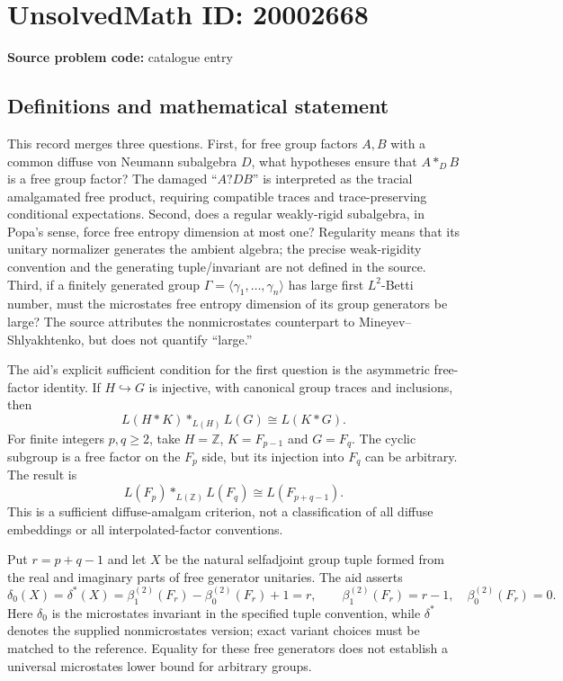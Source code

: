 \documentclass[11pt]{article}
\newcommand{\Z}{\mathbb{Z}}
\begin{document}
\section*{UnsolvedMath ID: 20002668}
\textbf{Source problem code:} catalogue entry
\subsection{Definitions and mathematical statement}
This record merges three questions. First, for free group factors $A,B$ with a common diffuse von Neumann subalgebra $D$, what hypotheses ensure that $A*_D B$ is a free group factor? The damaged ``$A?DB$'' is interpreted as the tracial amalgamated free product, requiring compatible traces and trace-preserving conditional expectations. Second, does a regular weakly-rigid subalgebra, in Popa's sense, force free entropy dimension at most one? Regularity means that its unitary normalizer generates the ambient algebra; the precise weak-rigidity convention and the generating tuple/invariant are not defined in the source. Third, if a finitely generated group $\Gamma=\langle\gamma_1,\ldots,\gamma_n\rangle$ has large first $L^2$-Betti number, must the microstates free entropy dimension of its group generators be large? The source attributes the nonmicrostates counterpart to Mineyev--Shlyakhtenko, but does not quantify ``large.''

The aid's explicit sufficient condition for the first question is the asymmetric free-factor identity. If $H\hookrightarrow G$ is injective, with canonical group traces and inclusions, then
\[
L(H*K)*_{L(H)}L(G)\cong L(K*G).
\]
For finite integers $p,q\geq2$, take $H=\Z$, $K=F_{p-1}$ and $G=F_q$. The cyclic subgroup is a free factor on the $F_p$ side, but its injection into $F_q$ can be arbitrary. The result is
\[
L(F_p)*_{L(\Z)}L(F_q)\cong L(F_{p+q-1}).
\]
This is a sufficient diffuse-amalgam criterion, not a classification of all diffuse embeddings or all interpolated-factor conventions.

Put $r=p+q-1$ and let $X$ be the natural selfadjoint group tuple formed from the real and imaginary parts of free generator unitaries. The aid asserts
\[
\delta_0(X)=\delta^*(X)=\beta_1^{(2)}(F_r)-\beta_0^{(2)}(F_r)+1=r,
\qquad\beta_1^{(2)}(F_r)=r-1,\quad\beta_0^{(2)}(F_r)=0.
\]
Here $\delta_0$ is the microstates invariant in the specified tuple convention, while $\delta^*$ denotes the supplied nonmicrostates version; exact variant choices must be matched to the reference. Equality for these free generators does not establish a universal microstates lower bound for arbitrary groups.
\end{document}
